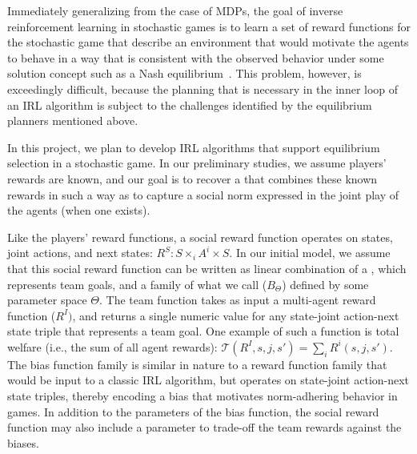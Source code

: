 Immediately generalizing from the case of MDPs, the goal of inverse
reinforcement learning in stochastic games is to learn a set of reward
functions for the stochastic game that describe an environment that
would motivate the agents to behave in a way that is consistent with
the observed behavior under some solution concept such as a Nash
equilibrium~\cite{reddy2012inverse}.  This problem, however, is
exceedingly difficult, because the planning that is necessary in the
inner loop of an IRL algorithm is subject to the challenges identified
by the equilibrium planners mentioned above.


In this project, we plan to develop IRL algorithms that support
equilibrium selection in a stochastic game.  In our preliminary
studies, we assume players' rewards are known, and our goal is to
recover a  that combines these known
rewards in such a way as to capture a social norm expressed in the
joint play of the agents (when one exists).

Like the players' reward functions, a social reward function operates
on states, joint actions, and next states: $R^S : S \times_i A^i
\times S$.  In our initial model, we assume that this social reward
function can be written as linear combination of a , which represents team goals,
and a family of what we call  ($B_\Theta$)
defined by some parameter space $\Theta$.  The team function takes as
input a multi-agent reward function ($R^I)$, and returns a single
numeric value for any state-joint action-next state triple that
represents a team goal. One example of such a function is total
welfare (i.e., the sum of all agent rewards): 
${\mathcal T}(R^I, s, j, s') = \sum_i R^i(s, j, s')$.
%
The bias function family is similar in nature to a reward function
family that would be input to a classic IRL algorithm, but operates on
state-joint action-next state triples, thereby encoding a bias that
motivates norm-adhering behavior in games.  In addition to the
parameters of the bias function, the social reward function may also
include a parameter
to trade-off the team rewards against the biases.


